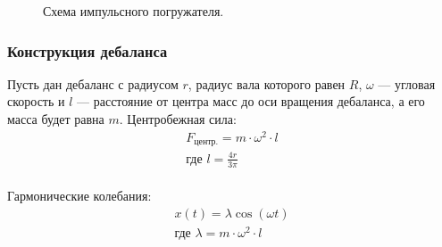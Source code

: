 \documentclass[10pt, pdf, hyperref={unicode}]{beamer}
\begin{document}
\begin{frame}
\begin{center}
\begin{minipage}[h]{0.97\linewidth}
\begin{minipage}[h]{0.36\linewidth}
\begin{figure}[h]
                        \caption{Схема импульсного погружателя.}
                    \end{figure}
                \end{minipage}
            \end{minipage}
        \end{center}
    \end{frame}


    \begin{frame}
        \frametitle{Конструкция дебаланса}
        \begin{center}
            \begin{minipage}[h]{0.97\linewidth}
                \begin{minipage}[h]{0.6\linewidth}
                    Пусть дан  дебаланс с радиусом $r$, радиус вала которого равен $R$,
                    $\omega$ --- угловая скорость и $l$ --- расстояние от центра масс до оси вращения дебаланса, а его масса будет равна $m$.
                    Центробежная сила:
                    \begin{equation}
                        \begin{gathered}
                            F_{\textrm{центр.}} = m \cdot \omega^2 \cdot l \\
                            \textrm{где } l = \frac{4 r}{3 \pi}
                        \end{gathered}
                    \end{equation}
                    \\
                    Гармонические колебания:
                    \begin{equation}
                        \begin{gathered}
                            x(t) = \lambda \cos (\omega t) \\
                            \textrm{где } \lambda = m \cdot \omega^2 \cdot l
                        \end{gathered}
                    \end{equation}
                \end{minipage}
                \hfill
                \begin{minipage}[h]{0.36\linewidth}
                    \begin{figure}[h]
                        \centering

\end{figure}
\end{minipage}
\end{minipage}
\end{center}
\end{frame}
\end{document}
